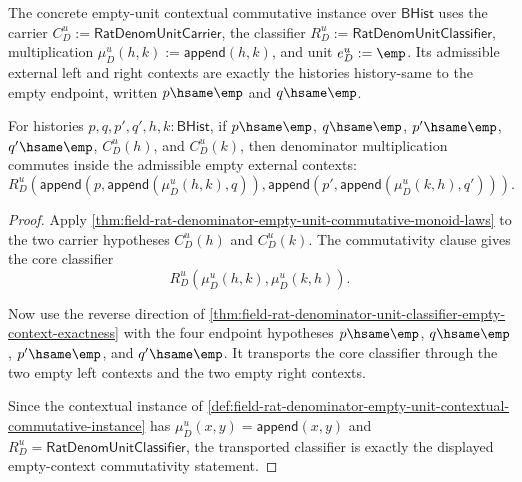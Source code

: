 \begin{definition}
\label{def:field-rat-denominator-empty-unit-contextual-commutative-instance}
The concrete empty-unit contextual commutative instance over $\mathsf{BHist}$
uses the carrier
$C_D^u:=\mathsf{RatDenomUnitCarrier}$, the classifier
$R_D^u:=\mathsf{RatDenomUnitClassifier}$, multiplication
$\mu_D^u(h,k):=\mathsf{append}(h,k)$, and unit $e_D^u:=\emp$.
Its admissible external left and right contexts are exactly the histories
history-same to the empty endpoint, written $p\hsame\emp$ and $q\hsame\emp$.
\end{definition}

\begin{theorem}
\label{thm:field-rat-denominator-empty-unit-contextual-commutativity}
For histories $p,q,p',q',h,k:\mathsf{BHist}$, if
$p\hsame\emp$, $q\hsame\emp$, $p'\hsame\emp$, $q'\hsame\emp$,
$C_D^u(h)$, and $C_D^u(k)$, then denominator multiplication commutes inside
the admissible empty external contexts:
$$
R_D^u(\mathsf{append}(p,\mathsf{append}(\mu_D^u(h,k),q)),
\mathsf{append}(p',\mathsf{append}(\mu_D^u(k,h),q'))).
$$
\end{theorem}
\begin{proof}
Apply
\autoref{thm:field-rat-denominator-empty-unit-commutative-monoid-laws} to the
two carrier hypotheses $C_D^u(h)$ and $C_D^u(k)$. The commutativity clause gives
the core classifier
$$
R_D^u(\mu_D^u(h,k),\mu_D^u(k,h)).
$$

Now use the reverse direction of
\autoref{thm:field-rat-denominator-unit-classifier-empty-context-exactness}
with the four endpoint hypotheses
$p\hsame\emp$, $q\hsame\emp$, $p'\hsame\emp$, and $q'\hsame\emp$. It transports
the core classifier through the two empty left contexts and the two empty right
contexts.

Since the contextual instance of
\autoref{def:field-rat-denominator-empty-unit-contextual-commutative-instance}
has $\mu_D^u(x,y)=\mathsf{append}(x,y)$ and
$R_D^u=\mathsf{RatDenomUnitClassifier}$, the transported classifier is exactly
the displayed empty-context commutativity statement.
\end{proof}

